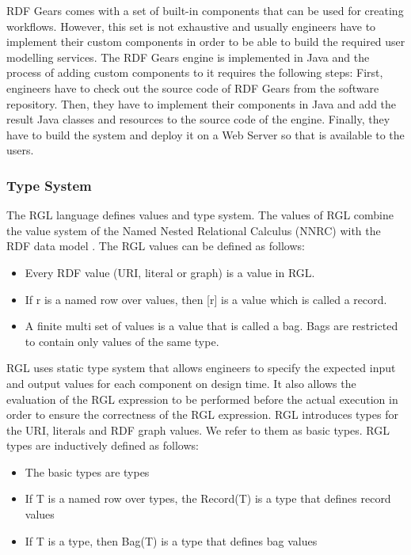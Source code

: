 RDF Gears comes with a set of built-in components that can be used for creating workflows. However, this set is not exhaustive and usually engineers have to implement their custom components in order to be able to build the required user modelling services. The RDF Gears engine is implemented in Java and the process of adding custom components to it requires the following steps: First, engineers have to check out the source code of RDF Gears from the software repository. Then, they have to implement their components in Java and add the result Java classes and resources to the source code of the engine.  Finally, they have to build the system and deploy it on a Web Server so that is available to the users.

\subsubsection{Type System}

The RGL language defines values and type system. The values of RGL combine the value system of the Named Nested Relational Calculus (NNRC) with the RDF data model \cite{feliksik2011}. The RGL values can be defined as follows:

\begin{itemize}
	\item Every RDF value (URI, literal or graph) is a value in RGL.
	
	\item If r is a named row over values, then [r] is a value which is called a record.
	
	\item A finite multi set of values is a value that is called a bag. Bags are restricted to contain only values of the same type.
\end{itemize}

RGL uses static type system that allows engineers to specify the expected input and output values for each component on design time. It also allows the evaluation of the RGL expression to be performed before the actual execution in order to ensure the correctness of the RGL expression. RGL introduces types for the URI, literals and RDF graph values. We refer to them as basic types. RGL types are inductively defined as follows:

\begin{itemize}
	\item The basic types are types
	\item If T is a named row over types, the Record(T) is a type that defines record values
	\item If T is a type, then Bag(T) is a type that defines bag values
\end{itemize}

